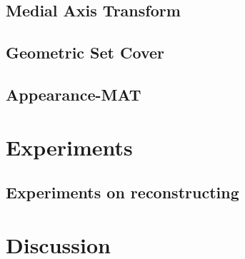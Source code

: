 \documentclass[10pt,twocolumn,letterpaper]{article}
\begin{document}
\subsection{Medial Axis Transform}
\subsection{Geometric Set Cover}
\subsection{Appearance-MAT}

\section{Experiments}\label{sec:experiments}
\subsection{Experiments on reconstructing }

\section{Discussion}\label{sec:discussion}

{\small


}
\end{document}
